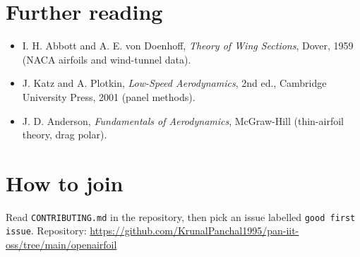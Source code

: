 \documentclass[11pt,a4paper]{article}
\begin{document}
\section{Further reading}
\begin{itemize}[nosep]
\item I. H. Abbott and A. E. von Doenhoff, \emph{Theory of Wing Sections}, Dover, 1959 (NACA airfoils and wind-tunnel data).
\item J. Katz and A. Plotkin, \emph{Low-Speed Aerodynamics}, 2nd ed., Cambridge University Press, 2001 (panel methods).
\item J. D. Anderson, \emph{Fundamentals of Aerodynamics}, McGraw-Hill (thin-airfoil theory, drag polar).
\end{itemize}

\section{How to join}
Read \texttt{CONTRIBUTING.md} in the repository, then pick an issue labelled \texttt{good first issue}. Repository: \url{https://github.com/KrunalPanchal1995/pan-iit-oss/tree/main/openairfoil}
\end{document}
